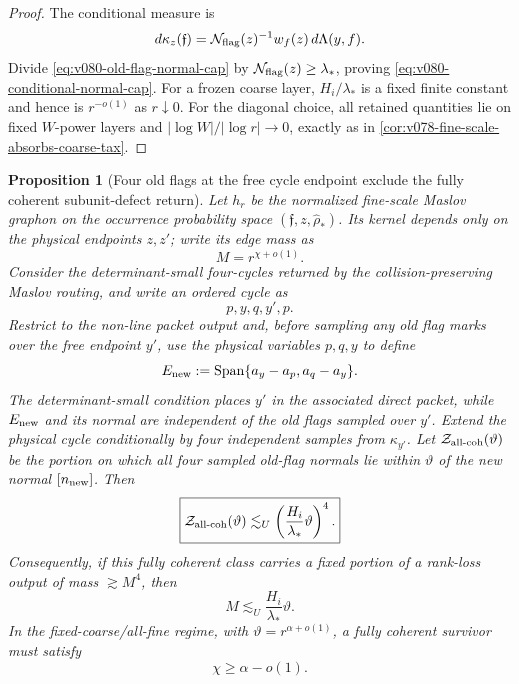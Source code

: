 \documentclass[10pt]{article}
\newtheorem{proposition}[theorem]{Proposition}
\newcommand{\Span}{\operatorname{Span}}
\begin{document}
\begin{proof}
The conditional measure is
\[
d\kappa_z(\mathfrak f)
=
\mathcal N_{\rm flag}(z)^{-1}
w_f(z)\,d\Lambda(y,f).
\]
Divide \eqref{eq:v080-old-flag-normal-cap} by
\(\mathcal N_{\rm flag}(z)\ge\lambda_*\), proving
\eqref{eq:v080-conditional-normal-cap}.  For a frozen coarse layer,
\(H_i/\lambda_*\) is a fixed finite constant and hence is \(r^{-o(1)}\) as \(r\downarrow0\).
For the diagonal choice, all retained quantities lie on fixed \(W\)-power layers and
\(|\log W|/|\log r|\to0\), exactly as in
\cref{cor:v078-fine-scale-absorbs-coarse-tax}.
\end{proof}

\begin{proposition}[Four old flags at the free cycle endpoint exclude the fully coherent
subunit-defect return]
\label{prop:v080-four-flag-coherent-exclusion}
Let \(h_r\) be the normalized fine-scale Maslov graphon on the occurrence probability space
\((\mathfrak f,z,\widehat\rho_*)\).  Its kernel depends only on the physical endpoints \(z,z'\);
write its edge mass as
\[
M=r^{\chi+o(1)}.
\]
Consider the determinant-small four-cycles returned by the collision-preserving Maslov routing,
and write an ordered cycle as
\[
p,y,q,y',p.
\]
Restrict to the non-line packet output and, before sampling any old flag marks over the free
endpoint \(y'\), use the physical variables \(p,q,y\) to define
\[
E_{\rm new}
:=
\Span\{a_y-a_p,a_q-a_y\}.
\]
The determinant-small condition places \(y'\) in the associated direct packet, while
\(E_{\rm new}\) and its normal are independent of the old flags sampled over \(y'\).  Extend the
physical cycle conditionally by four independent samples from \(\kappa_{y'}\).  Let
\(\mathcal Z_{\rm all\text{-}coh}(\vartheta)\) be the portion on
which all four sampled old-flag normals lie within \(\vartheta\) of the new normal
\([n_{\rm new}]\).  Then
\begin{equation}
\label{eq:v080-four-flag-coherent-cycle-cost}
\boxed{
\mathcal Z_{\rm all\text{-}coh}(\vartheta)
\lesssim_U
\left(\frac{H_i}{\lambda_*}\vartheta\right)^4.
}
\end{equation}
Consequently, if this fully coherent class carries a fixed portion of a rank-loss output of mass
\(\gtrsim M^4\), then
\begin{equation}
\label{eq:v080-coherent-cycle-necessary-angular-scale}
\boxed{
M
\lesssim_U
\frac{H_i}{\lambda_*}\vartheta.
}
\end{equation}
In the fixed-coarse/all-fine regime, with
\(\vartheta=r^{\alpha+o(1)}\), a fully coherent survivor must satisfy
\begin{equation}
\label{eq:v080-coherent-cycle-power-region}
\boxed{\chi\ge\alpha-o(1).}
\end{equation}


\end{proposition}
\end{document}

